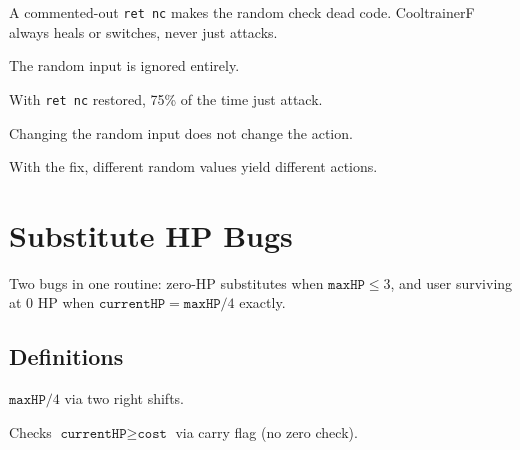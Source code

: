 A commented-out \texttt{ret nc} makes the random check dead code.
CooltrainerF always heals or switches, never just attacks.

\begin{definition}\label{def:cooltrainerf_buggy}
  \leanok
  The random input is ignored entirely.
\end{definition}

\begin{definition}\label{def:cooltrainerf_fixed}
  \leanok
  With \texttt{ret nc} restored, 75\% of the time just attack.
\end{definition}

\begin{theorem}\label{thm:random_dead_code}
  \leanok
  Changing the random input does not change the action.
\end{theorem}

\begin{theorem}\label{thm:fix_uses_random}
  \leanok
  With the fix, different random values yield different actions.
\end{theorem}

\chapter{Substitute HP Bugs}\label{ch:substitute}

Two bugs in one routine: zero-HP substitutes when $\texttt{maxHP} \le 3$,
and user surviving at 0 HP when $\texttt{currentHP} = \texttt{maxHP}/4$ exactly.

\section{Definitions}

\begin{definition}[Substitute HP]\label{def:substitute_hp}
  \leanok
  $\texttt{maxHP} / 4$ via two right shifts.
\end{definition}

\begin{definition}\label{def:can_afford}
  \leanok
  Checks $\texttt{currentHP} \ge \texttt{cost}$ via carry flag (no zero check).
\end{definition}

